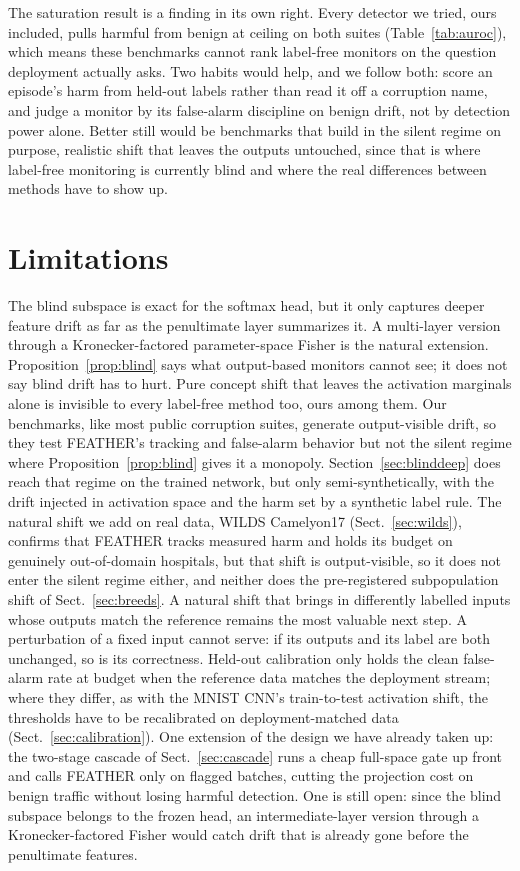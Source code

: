 \documentclass[graybox]{SNmult}
\begin{document}
The saturation result is a finding in its own right. Every detector we tried,
ours included, pulls harmful from benign at ceiling on both suites
(Table~\ref{tab:auroc}), which means these benchmarks cannot rank label-free
monitors on the question deployment actually asks. Two habits would help, and
we follow both: score an episode's harm from held-out labels rather than read
it off a corruption name, and judge a monitor by its false-alarm discipline on
benign drift, not by detection power alone. Better still would be benchmarks
that build in the silent regime on purpose, realistic shift that leaves the
outputs untouched, since that is where label-free monitoring is currently
blind and where the real differences between methods have to show up.

\section{Limitations}
\label{sec:limitations}

The blind subspace is exact for the softmax head, but it only captures deeper
feature drift as far as the penultimate layer summarizes it. A multi-layer
version through a Kronecker-factored parameter-space Fisher
\cite{martens2015kfac} is the natural extension. Proposition~\ref{prop:blind}
says what output-based monitors cannot see; it does not say blind drift has to
hurt. Pure concept shift that leaves the activation marginals alone is
invisible to every label-free method too, ours among them. Our benchmarks,
like most public corruption suites, generate output-visible drift, so they
test FEATHER's tracking and false-alarm behavior but not the silent regime
where Proposition~\ref{prop:blind} gives it a monopoly.
Section~\ref{sec:blinddeep} does reach that regime on the trained network, but
only semi-synthetically, with the drift injected in activation space and the
harm set by a synthetic label rule. The natural shift we add on real data,
WILDS Camelyon17 (Sect.~\ref{sec:wilds}), confirms that FEATHER tracks measured
harm and holds its budget on genuinely out-of-domain hospitals, but that shift
is output-visible, so it does not enter the silent regime either, and
neither does the pre-registered subpopulation shift of
Sect.~\ref{sec:breeds}. A natural shift that brings in differently
labelled inputs whose outputs match the reference remains the most
valuable next step. A perturbation of a fixed
input cannot serve: if its outputs and its label are both unchanged, so is
its correctness. Held-out calibration only holds the clean false-alarm
rate at budget when the reference data matches the deployment stream; where
they differ, as with the MNIST CNN's train-to-test activation shift, the
thresholds have to be recalibrated on deployment-matched data
(Sect.~\ref{sec:calibration}). One extension of the design we have
already taken up: the two-stage cascade of Sect.~\ref{sec:cascade} runs a cheap
full-space gate up front and calls FEATHER only on flagged batches, cutting the
projection cost on benign traffic without losing harmful detection. One is
still open: since the blind subspace belongs to the frozen head, an
intermediate-layer version through a Kronecker-factored Fisher
\cite{martens2015kfac} would catch drift that is already gone before the
penultimate features.
\end{document}
